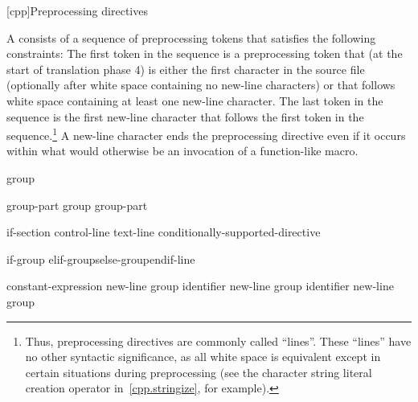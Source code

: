 [cpp]{Preprocessing directives}%

%
%


\pnum
A  consists of a sequence of preprocessing tokens
that satisfies the following constraints:
The first token in the sequence is a
\tcode{\#}
preprocessing token that (at the start of translation phase 4)
is either the first character in the source file
(optionally after white space containing no new-line characters)
or that follows white space containing at least one new-line character.
The last token in the sequence is the first new-line character
that follows the first token in the sequence.\footnote{Thus,
preprocessing directives are commonly called ``lines''.
These ``lines'' have no other syntactic significance,
as all white space is equivalent except in certain situations
during preprocessing (see the
\tcode{\#}
character string literal creation operator in~\ref{cpp.stringize}, for example).}
A new-line character ends the preprocessing directive even if it occurs
within what would otherwise be an invocation of a function-like macro.

\begin{bnf}
\br
    group\opt
\end{bnf}

\begin{bnf}
\br
    group-part\br
    group group-part
\end{bnf}

\begin{bnf}
\br
    if-section\br
    control-line\br
    text-line\br
    \terminal{\#} conditionally-supported-directive
\end{bnf}

\begin{bnf}
\br
    if-group elif-groups\opt else-group\opt endif-line
\end{bnf}

\begin{bnftab}
\br
\>\>\>constant-expression new-line group\opt\br
\>\>\>identifier new-line group\opt\br
\>\>\>identifier new-line group\opt
\end{bnftab}


